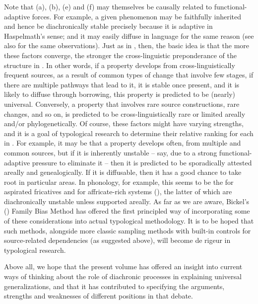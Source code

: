 \documentclass[output=paper]{langsci/langscibook}
\begin{document}
Note that (a), (b), (e) and (f) may themselves be causally related to functional-adaptive forces. For example, a given phenomenon may be faithfully inherited and hence be diachronically stable precisely because it is adaptive in Haspelmath’s sense; and it may easily diffuse in language  for the same reason (see also \citealt{Bickel2013,Bickel2017} for the same observations). 
Just as in \citet{Greenberg1978_Diachr}, then, the basic idea is that the more these factors converge, the stronger the cross-linguistic preponderance of the structure in . In other words, if a property develops from cross-linguistically frequent sources, as a result of common types of change that involve few stages, if there are multiple pathways that lead to it, it is stable once present, and it is likely to diffuse through borrowing, this property is predicted to be (nearly) universal. Conversely, a property that involves rare source constructions, rare changes, and so on, is predicted to be cross-linguistically rare or limited areally and/or phylogenetically. Of course, these factors might have varying strengths, and it is a goal of typological research to determine their relative ranking for each  in . For example, it may be that a property develops often, from multiple and common sources, but if it is inherently unstable – say, due to a strong functional-adaptive pressure to eliminate it – then it is predicted to be sporadically attested areally and genealogically. If it is diffusable, then it has a good chance to take root in particular areas. In phonology, for example, this seems to be the  for aspirated fricatives \citep{Jacques2011} and for affricate-rich systems (\citealt{NikolaevGrossman2018}), the latter of which are diachronically unstable unless supported areally. As far as we are aware, Bickel’s (\citeyear{Bickel2011_Modelling,Bickel2013}) Family Bias Method has offered the first principled way of incorporating some of these considerations into actual typological methodology. It is to be hoped that such methods, alongside more classic sampling methods with built-in controls for source-related dependencies (as suggested above), will become de rigeur in  typological research.

Above all, we hope that the present volume has offered an insight into current ways of thinking about the role of diachronic processes in explaining universal generalizations, and that it has contributed to specifying the arguments, strengths and weaknesses of different positions in that debate.

\sloppy
\printbibliography[heading=subbibliography,notkeyword=this]
\end{document}
